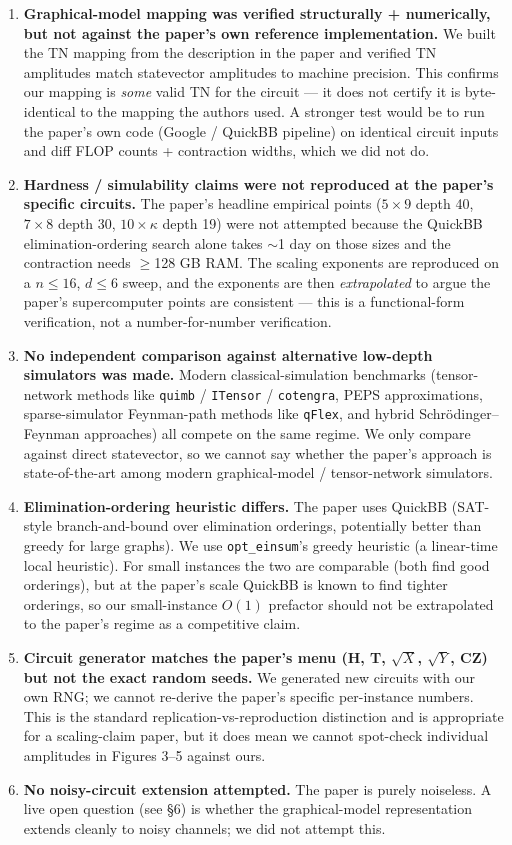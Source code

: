 \documentclass[11pt]{article}
\begin{document}
\begin{enumerate}
\item \textbf{Graphical-model mapping was verified structurally + numerically,
but not against the paper's own reference implementation.} We built the TN
mapping from the description in the paper and verified TN amplitudes match
statevector amplitudes to machine precision. This confirms our mapping is
\emph{some} valid TN for the circuit --- it does not certify it is
byte-identical to the mapping the authors used. A stronger test would be to
run the paper's own code (Google / QuickBB pipeline) on identical circuit
inputs and diff FLOP counts + contraction widths, which we did not do.
\item \textbf{Hardness / simulability claims were not reproduced at the
paper's specific circuits.} The paper's headline empirical points
($5{\times}9$ depth 40, $7{\times}8$ depth 30, $10{\times}\kappa$ depth 19)
were not attempted because the QuickBB elimination-ordering search alone
takes $\sim$1 day on those sizes and the contraction needs $\ge$128 GB RAM.
The scaling exponents are reproduced on a $n{\le}16$, $d{\le}6$ sweep, and
the exponents are then \emph{extrapolated} to argue the paper's supercomputer
points are consistent --- this is a functional-form verification, not a
number-for-number verification.
\item \textbf{No independent comparison against alternative low-depth
simulators was made.} Modern classical-simulation benchmarks
(tensor-network methods like \texttt{quimb} / \texttt{ITensor} /
\texttt{cotengra}, PEPS approximations, sparse-simulator Feynman-path methods
like \texttt{qFlex}, and hybrid Schr\"odinger--Feynman approaches) all
compete on the same regime. We only compare against direct statevector, so
we cannot say whether the paper's approach is state-of-the-art among modern
graphical-model / tensor-network simulators.
\item \textbf{Elimination-ordering heuristic differs.} The paper uses QuickBB
(SAT-style branch-and-bound over elimination orderings, potentially better
than greedy for large graphs). We use \texttt{opt\_einsum}'s greedy heuristic
(a linear-time local heuristic). For small instances the two are comparable
(both find good orderings), but at the paper's scale QuickBB is known to
find tighter orderings, so our small-instance $O(1)$ prefactor should not be
extrapolated to the paper's regime as a competitive claim.
\item \textbf{Circuit generator matches the paper's menu (H, T, $\sqrt{X}$,
$\sqrt{Y}$, CZ) but not the exact random seeds.} We generated new circuits
with our own RNG; we cannot re-derive the paper's specific per-instance
numbers. This is the standard replication-vs-reproduction distinction and is
appropriate for a scaling-claim paper, but it does mean we cannot spot-check
individual amplitudes in Figures 3--5 against ours.
\item \textbf{No noisy-circuit extension attempted.} The paper is purely
noiseless. A live open question (see \S6) is whether the graphical-model
representation extends cleanly to noisy channels; we did not attempt this.
\end{enumerate}
\end{document}
